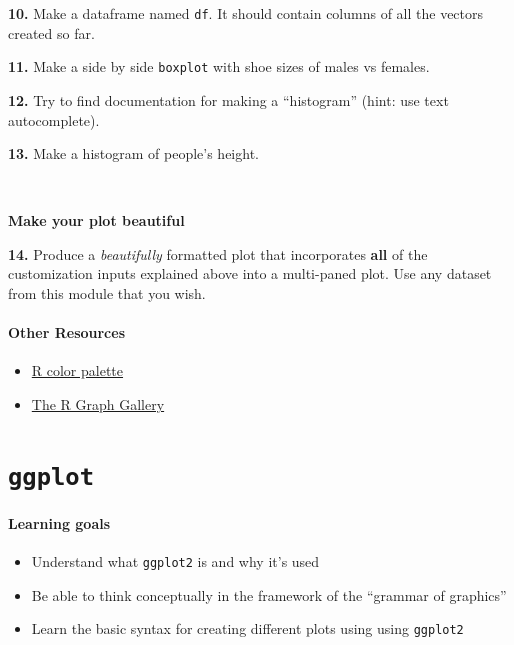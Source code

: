 \documentclass[
]{book}
\providecommand{\tightlist}{%
  \setlength{\itemsep}{0pt}\setlength{\parskip}{0pt}}
\begin{document}
\textbf{10.} Make a dataframe named \texttt{df}. It should contain columns of all the vectors created so far.

\textbf{11.} Make a side by side \texttt{boxplot} with shoe sizes of males vs females.

\textbf{12.} Try to find documentation for making a ``histogram'' (hint: use text autocomplete).

\textbf{13.} Make a histogram of people's height.

~

\textbf{Make your plot beautiful}

\textbf{14.} Produce a \emph{beautifully} formatted plot that incorporates \textbf{all} of the customization inputs explained above into a multi-paned plot. Use any dataset from this module that you wish.

\subsubsection*{Other Resources}\label{other-resources-2}

\begin{itemize}
\tightlist
\item
  \href{http://www.stat.columbia.edu/~tzheng/files/Rcolor.pdf}{R color palette}\\
\item
  \href{https://www.r-graph-gallery.com/}{The R Graph Gallery}
\end{itemize}

\chapter{\texorpdfstring{\texttt{ggplot}}{ggplot}}\label{ggplot}

\subsubsection*{Learning goals}\label{learning-goals-10}

\begin{itemize}
\tightlist
\item
  Understand what \texttt{ggplot2} is and why it's used
\item
  Be able to think conceptually in the framework of the ``grammar of graphics''
\item
  Learn the basic syntax for creating different plots using using \texttt{ggplot2}
\end{itemize}
\end{document}
